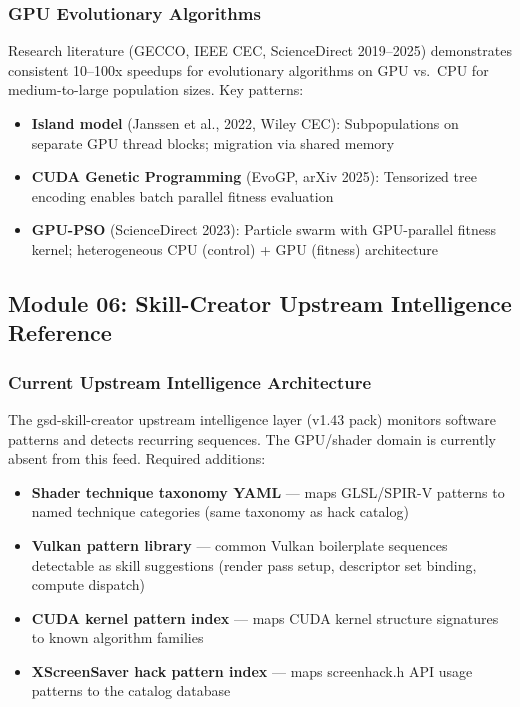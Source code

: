 \documentclass[11pt,letterpaper]{article}
\begin{document}
\subsubsection{GPU Evolutionary Algorithms}

Research literature (GECCO, IEEE CEC, ScienceDirect 2019--2025) demonstrates consistent 10--100x speedups for evolutionary algorithms on GPU vs.\ CPU for medium-to-large population sizes. Key patterns:
\begin{itemize}
\item \textbf{Island model} (Janssen et al., 2022, Wiley CEC): Subpopulations on separate GPU thread blocks; migration via shared memory
\item \textbf{CUDA Genetic Programming} (EvoGP, arXiv 2025): Tensorized tree encoding enables batch parallel fitness evaluation
\item \textbf{GPU-PSO} (ScienceDirect 2023): Particle swarm with GPU-parallel fitness kernel; heterogeneous CPU (control) + GPU (fitness) architecture
\end{itemize}

\subsection{Module 06: Skill-Creator Upstream Intelligence Reference}

\subsubsection{Current Upstream Intelligence Architecture}

The gsd-skill-creator upstream intelligence layer (v1.43 pack) monitors software patterns and detects recurring sequences. The GPU/shader domain is currently absent from this feed. Required additions:

\begin{itemize}
\item \textbf{Shader technique taxonomy YAML} --- maps GLSL/SPIR-V patterns to named technique categories (same taxonomy as hack catalog)
\item \textbf{Vulkan pattern library} --- common Vulkan boilerplate sequences detectable as skill suggestions (render pass setup, descriptor set binding, compute dispatch)
\item \textbf{CUDA kernel pattern index} --- maps CUDA kernel structure signatures to known algorithm families
\item \textbf{XScreenSaver hack pattern index} --- maps screenhack.h API usage patterns to the catalog database
\end{itemize}
\end{document}
